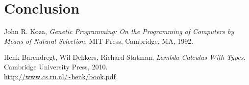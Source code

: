 \documentclass[12pt,a4paper]{report}
\begin{document}
\chapter*{Conclusion}
	

\begin{thebibliography}{9}



  John R. Koza,
  \emph{Genetic Programming: On the Programming of Computers by Means of Natural Selection}.
  MIT Press, Cambridge, MA,
  1992. 


  Henk Barendregt, Wil Dekkers, Richard Statman,
  \emph{Lambda Calculus With Types}.
  Cambridge University Press,
  2010. \\
  \url{http://www.cs.ru.nl/~henk/book.pdf}

\end{thebibliography}

	
	
\end{document}
